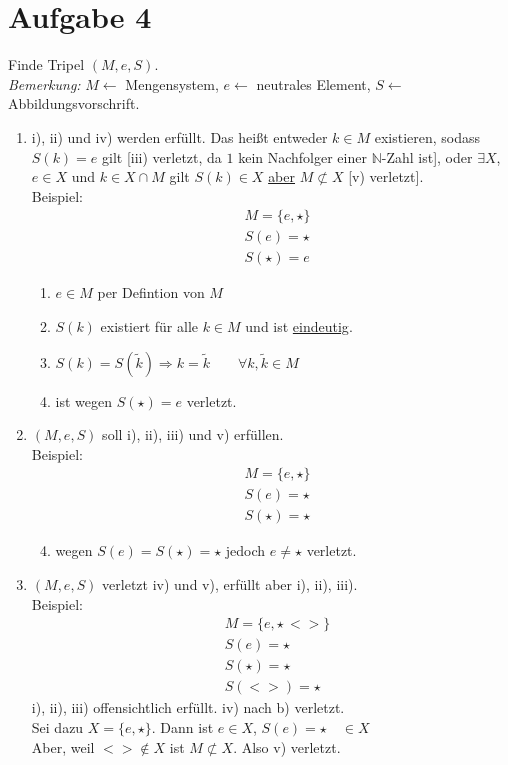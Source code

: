 \section{Aufgabe 4}
Finde Tripel $(M,e,S)$.\\\textit{Bemerkung:} $M \longleftarrow$ Mengensystem, $e \longleftarrow$ neutrales Element, $S \longleftarrow$ Abbildungsvorschrift.\\
\begin{enumerate}[label={\alph*)}]
  \item i), ii) und iv) werden erfüllt. Das heißt entweder $k\in M$ existieren, sodass $S(k)=e$ gilt [iii) verletzt, da $1$ kein Nachfolger einer $\mathbb{N}$-Zahl ist], oder $\exists X$, $e\in X$ und $k\in X\cap M$ gilt $S(k)\in X$ \underline{aber} $M\not\subset X$ [v) verletzt].\\
Beispiel:\begin{align}&M=\{e,\star\}\\&S(e)=\star\\&S(\star)=e\end{align}
  \begin{enumerate}[label={\roman*)}]
    \item $e\in M$ per Defintion von $M$
    \item $S(k)$ existiert für alle $k\in M$ und ist \underline{eindeutig}.
    \setcounter{enumii}{3}
    \item $S(k)=S(\tilde{k})\Longrightarrow k=\tilde{k} \qquad\forall k,\tilde{k} \in M$
    \setcounter{enumii}{2}
    \item ist wegen $S(\star)=e$ verletzt.
  \end{enumerate}
  \item $(M,e,S)$ soll i), ii), iii) und v) erfüllen.\\
  Beispiel:\begin{align}&M=\{e,\star\}\\&S(e)=\star\\&S(\star)=\star\end{align}
  \begin{enumerate}[label={\roman*)}]
    \setcounter{enumii}{3}
    \item wegen $S(e)=S(\star)=\star$ jedoch $e\neq\star$ verletzt.
  \end{enumerate}
  \item $(M,e,S)$ verletzt iv) und v), erfüllt aber i), ii), iii).\\
  Beispiel:\begin{align}&M=\{e,\star\,<>\}\\&S(e)=\star\\&S(\star)=\star\\&S(<>)=\star\end{align}
  i), ii), iii) offensichtlich erfüllt. iv) nach b) verletzt.\\
  Sei dazu $X=\{ e,\star \}$. Dann ist $e\in X$, $S(e)=\star \quad \in X$\\
  Aber, weil $<>\not\in X$ ist $M\not\subset X$. Also v) verletzt.
\end{enumerate}

